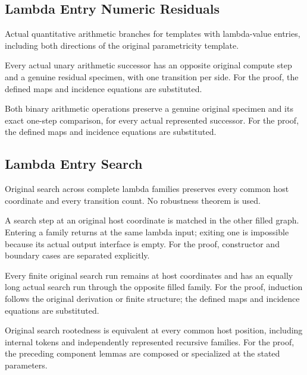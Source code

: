 \subsection{Lambda Entry Numeric Residuals}
Actual quantitative arithmetic branches for templates with lambda-value entries, including both directions of the original parametricity template.

Every actual unary arithmetic successor has an opposite original compute step and a genuine residual specimen, with one transition per side.
For the proof, the defined maps and incidence equations are substituted.
\par{}

Both binary arithmetic operations preserve a genuine original specimen and its exact one-step comparison, for every actual represented successor.
For the proof, the defined maps and incidence equations are substituted.
\par{}

\subsection{Lambda Entry Search}
Original search across complete lambda families preserves every common host coordinate and every transition count. No robustness theorem is used.

A search step at an original host coordinate is matched in the other filled graph. Entering a family returns at the same lambda input; exiting one is impossible because its actual output interface is empty.
For the proof, constructor and boundary cases are separated explicitly.
\par{}

Every finite original search run remains at host coordinates and has an equally long actual search run through the opposite filled family.
For the proof, induction follows the original derivation or finite structure; the defined maps and incidence equations are substituted.
\par{}

Original search rootedness is equivalent at every common host position, including internal tokens and independently represented recursive families.
For the proof, the preceding component lemmas are composed or specialized at the stated parameters.
\par{}

